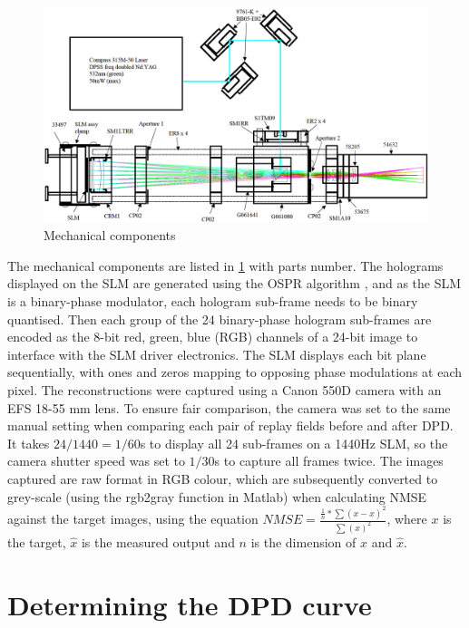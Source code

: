 \begin{figure}[H]
    \centering
    \includegraphics[width=\textwidth]{holographic_projector.png}
    \caption{Mechanical components \cite{Freeman2009}}
    \label{fig:holographic_projector}
\end{figure}

The mechanical components are listed in \cref{fig:holographic_projector} with parts number. The holograms displayed on the SLM are generated using the OSPR algorithm \cite{Cable2004}, and as the SLM is a binary-phase modulator, each hologram sub-frame needs to be binary quantised. Then each group of the 24 binary-phase hologram sub-frames are encoded as the 8-bit red, green, blue (RGB) channels of a 24-bit image to interface with the SLM driver electronics. The SLM displays each bit plane sequentially, with ones and zeros mapping to opposing phase modulations at each pixel. The reconstructions were captured using a Canon 550D camera with an EFS 18-55 mm lens. To ensure fair comparison, the camera was set to the same manual setting when comparing each pair of replay fields before and after DPD. It takes $24/1440=1/60$s to display all 24 sub-frames on a 1440Hz SLM, so the camera shutter speed was set to $1/30$s to capture all frames twice. The images captured are raw format in RGB colour, which are subsequently converted to grey-scale (using the rgb2gray function in Matlab\cite{MATLAB}) when calculating NMSE against the target images, using the equation $NMSE = \frac{\frac{1}{n} * \sum (x - \hat{x})^2}{\sum (x)^2}$, where $x$ is the target, $\hat{x}$ is the measured output and $n$ is the dimension of $x$ and $\hat{x}$.



\section{Determining the DPD curve}

